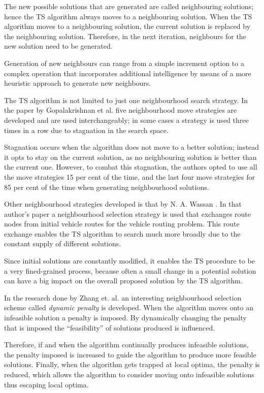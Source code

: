The new possible solutions that are generated are called neighbouring solutions; hence the TS algorithm always moves to a neighbouring solution. When the TS algorithm moves to a neighbouring solution, the current solution is replaced by the neighbouring solution. Therefore, in the next iteration, neighbours for the new solution need to be generated.

Generation of new neighbours can range from a simple increment option to a complex operation that incorporates additional intelligence by means of a more heuristic approach to generate new neighbours.

The TS algorithm is not limited to just one neighbourhood search strategy. In the paper by Gopalakrishnan et al.\cite{TabuCarryOver} five neighbourhood move strategies are developed and are used interchangeably; in some cases a strategy is used three times in a row due to stagnation in the search space. 

Stagnation occurs when the algorithm does not move to a better solution; instead it opts to stay on the current solution, as no neighbouring solution is better than the current one. However, to combat this stagnation, the authors opted to use all the move strategies 15 per cent of the time, and the last four move strategies for 85 per cent of the time when generating neighbourhood solutions.

Other neighbourhood strategies developed is that by N. A. Wassan \cite{ReactiveTabuVHR}. In that author's paper a neighbourhood selection strategy is used that exchanges route nodes from initial vehicle routes for the vehicle routing problem. This route exchange enables the TS algorithm to search much more broadly due to the constant supply of different solutions. 

Since initial solutions are constantly modified, it enables the TS procedure to be a very fined-grained process, because often a small change in a potential solution can have a big impact on the overall proposed solution by the TS algorithm.

In the research done by Zhang et. al.\cite{TSHazardous} an interesting neighbourhood selection scheme called \emph{dynamic penalty} is developed. When the algorithm moves onto an infeasible solution a penalty is imposed. By dynamically changing the penalty that is imposed the ``feasibility'' of solutions produced is influenced. 

Therefore, if and when the algorithm continually produces infeasible solutions, the penalty imposed is increased to guide the algorithm to produce more feasible solutions. Finally, when the algorithm gets trapped at local optima, the penalty is reduced, which allows the algorithm to consider moving onto infeasible solutions thus escaping local optima.

